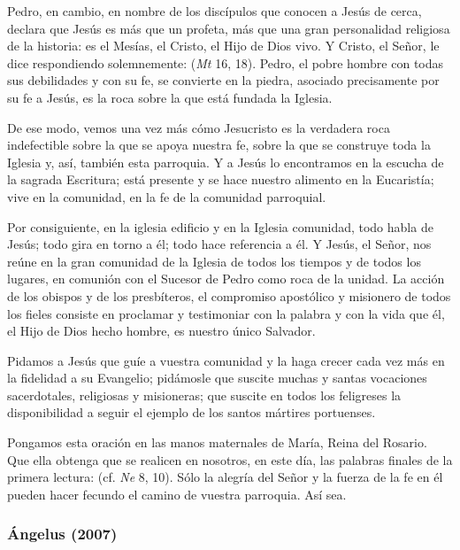 \begin{body}
					Pedro, en cambio, en nombre de los discípulos que conocen a Jesús de cerca, declara que Jesús es más que un profeta, más que una gran personalidad religiosa de la historia: es el Mesías, el Cristo, el Hijo de Dios vivo. Y Cristo, el Señor, le dice respondiendo solemnemente:  (\emph{Mt} 16, 18). Pedro, el pobre hombre con todas sus debilidades y con su fe, se convierte en la piedra, asociado precisamente por su fe a Jesús, es la roca sobre la que está fundada la Iglesia.
					
					De ese modo, vemos una vez más cómo Jesucristo es la verdadera roca indefectible sobre la que se apoya nuestra fe, sobre la que se construye toda la Iglesia y, así, también esta parroquia. Y a Jesús lo encontramos en la escucha de la sagrada Escritura; está presente y se hace nuestro alimento en la Eucaristía; vive en la comunidad, en la fe de la comunidad parroquial.
					
					Por consiguiente, en la iglesia edificio y en la Iglesia comunidad, todo habla de Jesús; todo gira en torno a él; todo hace referencia a él. Y Jesús, el Señor, nos reúne en la gran comunidad de la Iglesia de todos los tiempos y de todos los lugares, en comunión con el Sucesor de Pedro como roca de la unidad. La acción de los obispos y de los presbíteros, el compromiso apostólico y misionero de todos los fieles consiste en proclamar y testimoniar con la palabra y con la vida que él, el Hijo de Dios hecho hombre, es nuestro único Salvador.
					
					Pidamos a Jesús que guíe a vuestra comunidad y la haga crecer cada vez más en la fidelidad a su Evangelio; pidámosle que suscite muchas y santas vocaciones sacerdotales, religiosas y misioneras; que suscite en todos los feligreses la disponibilidad a seguir el ejemplo de los santos mártires portuenses.
					
					Pongamos esta oración en las manos maternales de María, Reina del Rosario. Que ella obtenga que se realicen en nosotros, en este día, las palabras finales de la primera lectura:  (cf. \emph{Ne} 8, 10). Sólo la alegría del Señor y la fuerza de la fe en él pueden hacer fecundo el camino de vuestra parroquia. Así sea.
				\end{body}

			\subsubsection{Ángelus (2007)}
				
